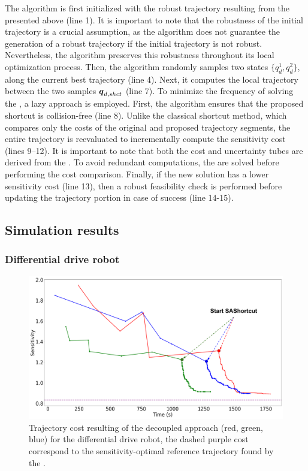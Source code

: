 The algorithm is first initialized with the robust trajectory resulting from the  presented above (line 1).
It is important to note that the robustness of the initial trajectory is a crucial assumption, as the  algorithm does not guarantee the generation of a robust trajectory if the initial trajectory is not robust.
Nevertheless, the algorithm preserves this robustness throughout its local optimization process.
Then, the algorithm randomly samples two states $\{q_d^{1}, q_d^{2}\}$, along the current best trajectory (line 4).
Next, it computes the local trajectory between the two samples $\boldsymbol{q}_{d,shct}$ (line 7).
To minimize the frequency of solving the , a lazy approach is employed.
First, the algorithm ensures that the proposed shortcut is collision-free (line 8). 
Unlike the classical shortcut method, which compares only the costs of the original and proposed trajectory segments, the entire trajectory is reevaluated to incrementally compute the sensitivity cost (lines 9–12).
It is important to note that both the cost and uncertainty tubes are derived from the . 
To avoid redundant computations, the  are solved before performing the cost comparison.
Finally, if the new solution has a lower sensitivity cost (line 13), then a robust feasibility check is performed before updating the trajectory portion in case of success (line 14-15).

\subsection{Simulation results}
\subsubsection{Differential drive robot}



\begin{figure}[h]
    \centering
    \includegraphics[width=0.7\linewidth]{figures/samp/sensi_cost_unic.png}
    \caption{Trajectory cost resulting of the decoupled approach (red, green, blue) for the differential drive robot, the dashed purple cost correspond to the sensitivity-optimal reference trajectory found by the .}
    \label{fig:sensi_cost_unic}
\end{figure}

